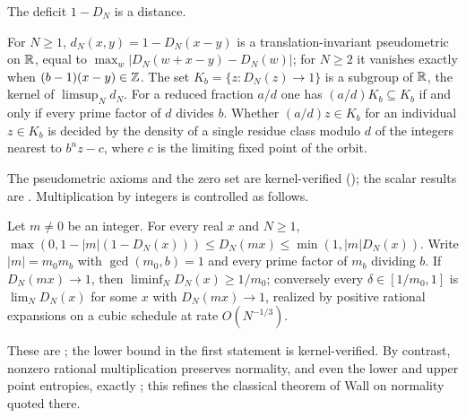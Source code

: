 \documentclass[11pt]{article}
\begin{document}
The deficit $1-D_N$ is a distance.

\begin{maintheorem}\label{thm:C}
For $N\ge1$, $d_N(x,y)=1-D_N(x-y)$ is a translation-invariant pseudometric on $\mathbb R$, equal to
$\max_w|D_N(w+x-y)-D_N(w)|$; for $N\ge2$ it vanishes exactly when $(b-1)(x-y)\in\mathbb Z$. The set
$K_b=\{z:D_N(z)\to1\}$ is a subgroup of $\mathbb R$, the kernel of $\limsup_Nd_N$. For a reduced fraction
$a/d$ one has $(a/d)K_b\subseteq K_b$ if and only if every prime factor of $d$ divides $b$. Whether
$(a/d)z\in K_b$ for an individual $z\in K_b$ is decided by the density of a single residue class
modulo $d$ of the integers nearest to $b^nz-c$, where $c$ is the limiting fixed point of the orbit.
\end{maintheorem}

The pseudometric axioms and the zero set are kernel-verified (); the scalar
results are . Multiplication by integers is controlled as follows.

\begin{maintheorem}\label{thm:D}
Let $m\ne0$ be an integer. For every real $x$ and $N\ge1$,
$\max(0,1-|m|(1-D_N(x)))\le D_N(mx)\le\min(1,|m|D_N(x))$. Write $|m|=m_0m_b$ with
$\gcd(m_0,b)=1$ and every prime factor of $m_b$ dividing $b$. If $D_N(mx)\to1$, then
$\liminf_ND_N(x)\ge1/m_0$; conversely every $\delta\in[1/m_0,1]$ is $\lim_ND_N(x)$ for some $x$ with
$D_N(mx)\to1$, realized by positive rational expansions on a cubic schedule at rate $O(N^{-1/3})$.
\end{maintheorem}

These are ; the lower bound in the first statement is
kernel-verified. By contrast, nonzero rational multiplication preserves normality, and even the lower
and upper point entropies, exactly \cite[Proposition~4.25]{BD25}; this refines the classical theorem of Wall on normality
quoted there.
\end{document}
